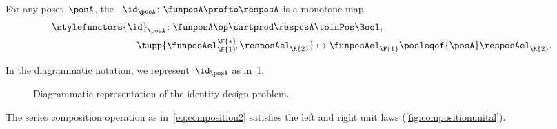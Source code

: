 \begin{definition}
    \label{def:dp-identity}
    For any poset~$\posA$, the \emph{}~$\id_\posA \colon \funposA \profto \resposA$ is a monotone map
    \begin{equation}
        \begin{aligned}
            \stylefunctors{\id}_\posA \colon \funposA\op \cartprod \resposA & \toinPos   \Bool, \label{eq:identity}                       \\
            \tupp{\funposAel_\F{1}^\F{*}\!,\resposAel_\R{2}}                 & \mapsto \funposAel_\F{1} \posleqof{\posA} \resposAel_\R{2}.
        \end{aligned}
    \end{equation}
\end{definition}
In the diagrammatic notation, we represent~$\id_\posA$ as in~\cref{fig:identitydp}.

\begin{figure}[h!]
    \centering
    \caption{Diagrammatic representation of the identity design problem.} \label{fig:identitydp}
\end{figure}

\begin{lemma}
    \label{lem:compositionunital}
    The series composition operation as in~\cref{eq:composition2} satisfies the left and right unit laws (\cref{fig:compositionunital}).
\end{lemma}

